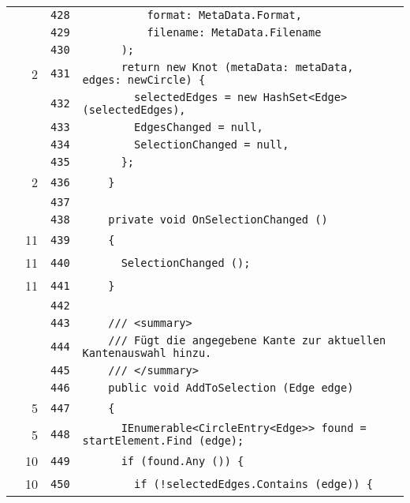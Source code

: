 \documentclass[a4paper,10pt]{article}
\begin{document}
\begin{longtable}[l]{lrrl}
\cellcolor{gray} &  & \verb~428~ & \verb~          format: MetaData.Format,~\\
\cellcolor{gray} &  & \verb~429~ & \verb~          filename: MetaData.Filename~\\
\cellcolor{gray} &  & \verb~430~ & \verb~      );~\\
\cellcolor{green} & 2 & \verb~431~ & \verb~      return new Knot (metaData: metaData, edges: newCircle) {~\\
\cellcolor{gray} &  & \verb~432~ & \verb~        selectedEdges = new HashSet<Edge> (selectedEdges),~\\
\cellcolor{gray} &  & \verb~433~ & \verb~        EdgesChanged = null,~\\
\cellcolor{gray} &  & \verb~434~ & \verb~        SelectionChanged = null,~\\
\cellcolor{gray} &  & \verb~435~ & \verb~      };~\\
\cellcolor{green} & 2 & \verb~436~ & \verb~    }~\\
\cellcolor{gray} &  & \verb~437~ & \verb~~\\
\cellcolor{gray} &  & \verb~438~ & \verb~    private void OnSelectionChanged ()~\\
\cellcolor{green} & 11 & \verb~439~ & \verb~    {~\\
\cellcolor{green} & 11 & \verb~440~ & \verb~      SelectionChanged ();~\\
\cellcolor{green} & 11 & \verb~441~ & \verb~    }~\\
\cellcolor{gray} &  & \verb~442~ & \verb~~\\
\cellcolor{gray} &  & \verb~443~ & \verb~    /// <summary>~\\
\cellcolor{gray} &  & \verb~444~ & \verb~    /// Fügt die angegebene Kante zur aktuellen Kantenauswahl hinzu.~\\
\cellcolor{gray} &  & \verb~445~ & \verb~    /// </summary>~\\
\cellcolor{gray} &  & \verb~446~ & \verb~    public void AddToSelection (Edge edge)~\\
\cellcolor{green} & 5 & \verb~447~ & \verb~    {~\\
\cellcolor{green} & 5 & \verb~448~ & \verb~      IEnumerable<CircleEntry<Edge>> found = startElement.Find (edge);~\\
\cellcolor{green} & 10 & \verb~449~ & \verb~      if (found.Any ()) {~\\
\cellcolor{green} & 10 & \verb~450~ & \verb~        if (!selectedEdges.Contains (edge)) {~\\

\end{longtable}
\end{document}
